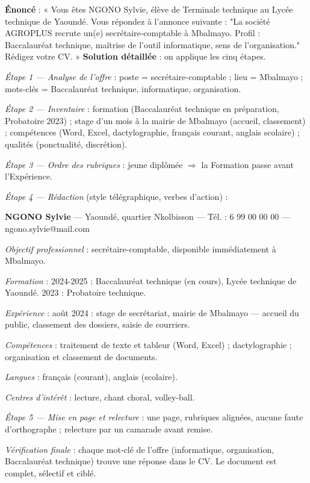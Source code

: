 \documentclass[11pt]{article}
\begin{document}
\begin{exoresolu}
\textbf{Énoncé} : « Vous êtes NGONO Sylvie, élève de Terminale technique au Lycée technique de Yaoundé. Vous répondez à l'annonce suivante : "La société AGROPLUS recrute un(e) secrétaire-comptable à Mbalmayo. Profil : Baccalauréat technique, maîtrise de l'outil informatique, sens de l'organisation." Rédigez votre CV. »
\tcblower
\textbf{Solution détaillée} : on applique les cinq étapes.

\emph{Étape 1 — Analyse de l'offre} : poste = secrétaire-comptable ; lieu = Mbalmayo ; mots-clés = Baccalauréat technique, informatique, organisation.

\emph{Étape 2 — Inventaire} : formation (Baccalauréat technique en préparation, Probatoire 2023) ; stage d'un mois à la mairie de Mbalmayo (accueil, classement) ; compétences (Word, Excel, dactylographie, français courant, anglais scolaire) ; qualités (ponctualité, discrétion).

\emph{Étape 3 — Ordre des rubriques} : jeune diplômée $\Rightarrow$ la Formation passe avant l'Expérience.

\emph{Étape 4 — Rédaction} (style télégraphique, verbes d'action) :

\textbf{NGONO Sylvie} — Yaoundé, quartier Nkolbisson — Tél. : 6 99 00 00 00 — ngono.sylvie@mail.com

\emph{Objectif professionnel} : secrétaire-comptable, disponible immédiatement à Mbalmayo.

\emph{Formation} : 2024-2025 : Baccalauréat technique (en cours), Lycée technique de Yaoundé. 2023 : Probatoire technique.

\emph{Expérience} : août 2024 : stage de secrétariat, mairie de Mbalmayo — accueil du public, classement des dossiers, saisie de courriers.

\emph{Compétences} : traitement de texte et tableur (Word, Excel) ; dactylographie ; organisation et classement de documents.

\emph{Langues} : français (courant), anglais (scolaire).

\emph{Centres d'intérêt} : lecture, chant choral, volley-ball.

\emph{Étape 5 — Mise en page et relecture} : une page, rubriques alignées, aucune faute d'orthographe ; relecture par un camarade avant remise.

\emph{Vérification finale} : chaque mot-clé de l'offre (informatique, organisation, Baccalauréat technique) trouve une réponse dans le CV. Le document est complet, sélectif et ciblé.
\end{exoresolu}
\end{document}
